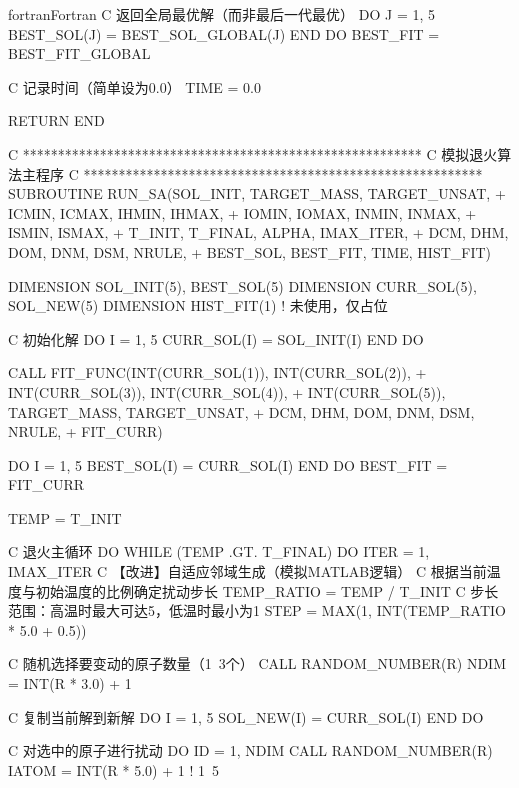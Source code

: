 \begin{envcode}{fortran}{Fortran}
C     返回全局最优解（而非最后一代最优）
      DO J = 1, 5
          BEST_SOL(J) = BEST_SOL_GLOBAL(J)
      END DO
      BEST_FIT = BEST_FIT_GLOBAL
      
C     记录时间（简单设为0.0）
      TIME = 0.0
      
      RETURN
      END
      
C     *********************************************************
C     模拟退火算法主程序
C     *********************************************************
      SUBROUTINE RUN_SA(SOL_INIT, TARGET_MASS, TARGET_UNSAT,
     +                  ICMIN, ICMAX, IHMIN, IHMAX,
     +                  IOMIN, IOMAX, INMIN, INMAX,
     +                  ISMIN, ISMAX,
     +                  T_INIT, T_FINAL, ALPHA, IMAX_ITER,
     +                  DCM, DHM, DOM, DNM, DSM, NRULE,
     +                  BEST_SOL, BEST_FIT, TIME, HIST_FIT)
      
      DIMENSION SOL_INIT(5), BEST_SOL(5)
      DIMENSION CURR_SOL(5), SOL_NEW(5)
      DIMENSION HIST_FIT(1)      ! 未使用，仅占位
      
C     初始化解
      DO I = 1, 5
          CURR_SOL(I) = SOL_INIT(I)
      END DO
      
      CALL FIT_FUNC(INT(CURR_SOL(1)), INT(CURR_SOL(2)),
     +              INT(CURR_SOL(3)), INT(CURR_SOL(4)),
     +              INT(CURR_SOL(5)), TARGET_MASS, TARGET_UNSAT,
     +              DCM, DHM, DOM, DNM, DSM, NRULE,
     +              FIT_CURR)
      
      DO I = 1, 5
          BEST_SOL(I) = CURR_SOL(I)
      END DO
      BEST_FIT = FIT_CURR
      
      TEMP = T_INIT
      
C     退火主循环
      DO WHILE (TEMP .GT. T_FINAL)
          DO ITER = 1, IMAX_ITER
C             【改进】自适应邻域生成（模拟MATLAB逻辑）
C             根据当前温度与初始温度的比例确定扰动步长
              TEMP_RATIO = TEMP / T_INIT
C             步长范围：高温时最大可达5，低温时最小为1
              STEP = MAX(1, INT(TEMP_RATIO * 5.0 + 0.5))
              
C             随机选择要变动的原子数量（1~3个）
              CALL RANDOM_NUMBER(R)
              NDIM = INT(R * 3.0) + 1
              
C             复制当前解到新解
              DO I = 1, 5
                  SOL_NEW(I) = CURR_SOL(I)
              END DO
              
C             对选中的原子进行扰动
              DO ID = 1, NDIM
                  CALL RANDOM_NUMBER(R)
                  IATOM = INT(R * 5.0) + 1   ! 1~5
                  

\end{envcode}
